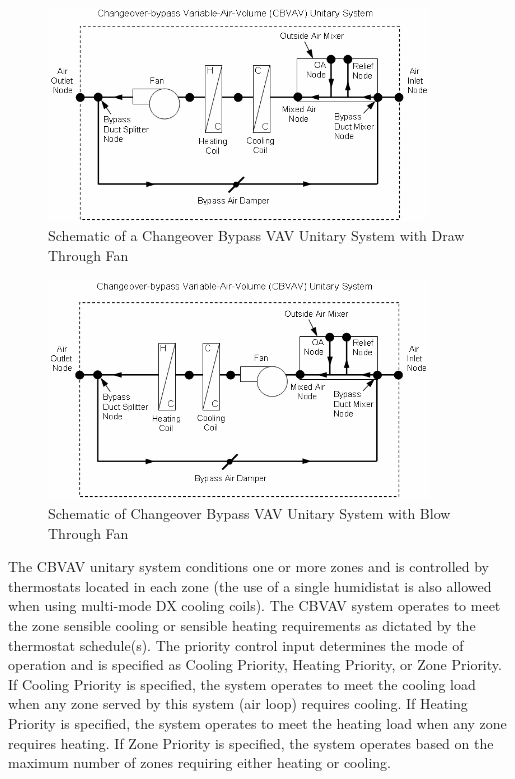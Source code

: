 \begin{figure}[hbtp] %
\centering
\includegraphics[width=0.9\textwidth, height=0.9\textheight, keepaspectratio=true]{media/image5052.png}
\caption{Schematic of a Changeover Bypass VAV Unitary System with Draw Through Fan \protect \label{fig:schematic-of-a-changeover-bypass-vav-unitary}}
\end{figure}

\begin{figure}[hbtp] %
\centering
\includegraphics[width=0.9\textwidth, height=0.9\textheight, keepaspectratio=true]{media/image5053.png}
\caption{Schematic of Changeover Bypass VAV Unitary System with Blow Through Fan \protect \label{fig:schematic-of-changeover-bypass-vav-unitary}}
\end{figure}

The CBVAV unitary system conditions one or more zones and is controlled by thermostats located in each zone (the use of a single humidistat is also allowed when using multi-mode DX cooling coils). The CBVAV system operates to meet the zone sensible cooling or sensible heating requirements as dictated by the thermostat schedule(s). The priority control input determines the mode of operation and is specified as Cooling Priority, Heating Priority, or Zone Priority. If Cooling Priority is specified, the system operates to meet the cooling load when any zone served by this system (air loop) requires cooling. If Heating Priority is specified, the system operates to meet the heating load when any zone requires heating. If Zone Priority is specified, the system operates based on the maximum number of zones requiring either heating or cooling.

